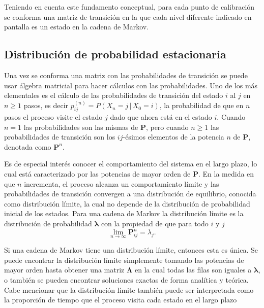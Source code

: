 Teniendo en cuenta este fundamento conceptual, para cada punto de calibración se conforma una matriz de transición en
la que cada nivel diferente indicado en pantalla es un estado en la cadena de Markov.

\subsection*{Distribución de probabilidad estacionaria}

Una vez se conforma una matriz con las probabilidades de transición se puede usar álgebra matricial para hacer cálculos
con las probabilidades.
Uno de los más elementales es el cálculo de las probabilidades de transición del estado $i$ al $j$ en $n \ge 1$ pasos,
es decir $p_{ij}^{(n)} = P\left(X_n = j \,|\,X_0 = i\right)$, la probabilidad de que en $n$ pasos el proceso visite el
estado $j$ dado que ahora está en el estado $i$.
Cuando $n = 1$ las probabilidades son las mismas de $\mathbf{P}$, pero cuando $n \ge 1$ las probabilidades de transición
son los $ij$-ésimos elementos de la potencia $n$ de $\mathbf{P}$, denotada como $\mathbf{P}^n$.

Es de especial interés conocer el comportamiento del sistema en el largo plazo, lo cual está caracterizado por las
potencias de mayor orden de $\mathbf{P}$.
En la medida en que $n$ incrementa, el proceso alcanza un comportamiento límite y las probabilidades de transición
convergen a una distribución de equilibrio, conocida como distribución límite, la cual no depende de la distribución de
probabilidad inicial de los estados.
Para una cadena de Markov la distribución límite es la distribución de probabilidad $\boldsymbol{\lambda}$ con la propiedad de
que para todo $i$ y $j$
%
\begin{equation}
    \lim_{n\to\infty} \mathbf{P}_{ij}^n = \lambda_{j}.
\end{equation}

Si una cadena de Markov tiene una distribución límite, entonces esta es única.
Se puede encontrar la distribución límite simplemente tomando las potencias de mayor orden hasta obtener una matriz
$\boldsymbol{\Lambda}$ en la cual todas las filas son iguales a $\boldsymbol{\lambda}$, o también se pueden encontrar soluciones
exactas de forma analítica y teórica.
Cabe mencionar que la distribución límite también puede ser interpretada como la proporción de tiempo que el proceso
visita cada estado en el largo plazo

